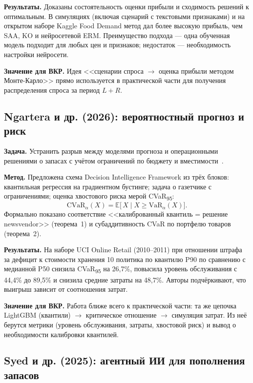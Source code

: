 \documentclass[12pt,a4paper]{article}
\newcommand{\E}{\mathbb{E}}
\begin{document}
\textbf{Результаты.} Доказаны состоятельность оценки прибыли
и сходимость решений к оптимальным. В симуляциях (включая сценарий
с текстовыми признаками) и на открытом наборе Kaggle Food Demand
метод дал более высокую прибыль, чем SAA, KO и нейросетевой ERM.
Преимущество подхода --- одна обученная модель подходит для любых
цен и признаков; недостаток --- необходимость настройки нейросети.

\textbf{Значение для ВКР.} Идея <<сценарии спроса $\to$ оценка
прибыли методом Монте-Карло>> прямо используется в практической части
для получения распределения спроса за период $L + R$.

\subsection{Ngartera и др. (2026): вероятностный прогноз и риск}

\textbf{Задача.} Устранить разрыв между моделями прогноза и
операционными решениями о запасах с учётом ограничений по бюджету
и вместимости~\cite{ngartera2026stochastic}.

\textbf{Метод.} Предложена схема Decision Intelligence Framework
из трёх блоков: квантильная регрессия на градиентном бустинге;
задача о газетчике с ограничениями; оценка хвостового риска мерой
CVaR\textsubscript{95}:
\begin{equation}
  \mathrm{CVaR}_{\alpha}(X) = \E\bigl[\,X \mid X \ge \mathrm{VaR}_{\alpha}(X)\bigr].
\end{equation}
Формально показано соответствие <<калиброванный квантиль = решение
newsvendor>> (теорема~1) и субаддитивность CVaR по портфелю товаров
(теорема~2).

\textbf{Результаты.} На наборе UCI Online Retail (2010--2011)
при отношении штрафа за дефицит к стоимости хранения 10 политика по
квантилю P90 по сравнению с медианной P50 снизила CVaR\textsubscript{95}
на 26{,}7\%, повысила уровень обслуживания с 44{,}4\% до 89{,}5\%
и снизила средние затраты на 48{,}7\%. Авторы подчёркивают,
что выигрыш зависит от соотношения затрат.

\textbf{Значение для ВКР.} Работа ближе всего к практической части:
та же цепочка LightGBM (квантили) $\to$ критическое отношение
$\to$ симуляция затрат. Из неё берутся метрики (уровень обслуживания,
затраты, хвостовой риск) и вывод о необходимости калибровки квантилей.

\subsection{Syed и др. (2025): агентный ИИ для пополнения запасов}
\end{document}
